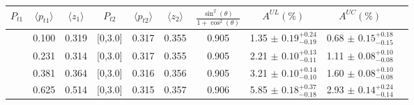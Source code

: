 \begin{table}[H]\scriptsize
\centering
\renewcommand{\arraystretch}{1.5}
\begin{tabular}{|c| c| c| c| c| c| c| c| c| c|}
\hline
$P_{t1}$ & $\langle  p_{t1} \rangle$ & $\langle  z_{1}  \rangle$ & $P_{t2}$ &  $\langle  p_{t2}\rangle$ & $\langle  z_{2}\rangle$ &$\frac{\sin^2(\theta)}{1+\cos^2(\theta)}$ &$A^{UL}(\%)$ &  $A^{UC}(\%)$   \\ \hline
[0,0.15]	&	0.100	&	0.319	&	[0,3.0]	&	0.317	&	0.355	&	0.905	&	1.35	$\pm$ $	0.19	_{	-0.19	}^{+	0.24	}$&	0.68	$\pm$ $	0.15	_{	-0.15	}^{+	0.18	}$\\ \hline
[0.15,0.3]	&	0.231	&	0.314	&	[0,3.0]	&	0.317	&	0.355	&	0.905	&	2.21	$\pm$ $	0.10	_{	-0.11	}^{+	0.13	}$&	1.11	$\pm$ $	0.08	_{	-0.08	}^{+	0.10	}$\\ \hline
[0.3,0.5]	&	0.381	&	0.364	&	[0,3.0]	&	0.316	&	0.356	&	0.905	&	3.21	$\pm$ $	0.10	_{	-0.10	}^{+	0.14	}$&	1.60	$\pm$ $	0.08	_{	-0.08	}^{+	0.10	}$\\ \hline
[0.5,3.0]	&	0.625	&	0.514	&	[0,3.0]	&	0.315	&	0.357	&	0.906	&	5.85	$\pm$ $	0.18	_{	-0.18	}^{+	0.37	}$&	2.93	$\pm$ $	0.14	_{	-0.14	}^{+	0.24	}$\\ \hline
																													

\end{tabular}
\end{table}
